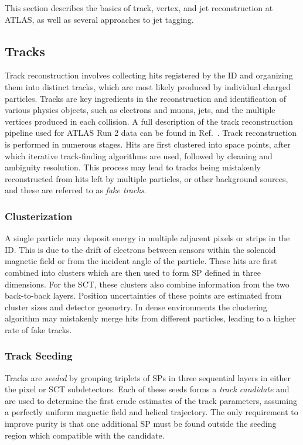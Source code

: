 This section describes the basics of track, vertex, and jet reconstruction at ATLAS, as well as several approaches to jet tagging.

\subsection{Tracks}

Track reconstruction involves collecting hits registered by the \Gls{ID} and organizing them into distinct tracks, which are most likely produced by individual charged particles.
Tracks are key ingredients in the reconstruction and identification of various physics objects, such as electrons and muons, jets, and the multiple vertices produced in each collision.
A full description of the track reconstruction pipeline used for ATLAS Run 2 data can be found in Ref.~\cite{PerformanceATLASTrack}.
Track reconstruction is performed in numerous stages.
Hits are first clustered into space points, after which iterative track-finding algorithms are used, followed by cleaning and ambiguity resolution.
This process may lead to tracks being mistakenly reconstructed from hits left by multiple particles, or other background sources, and these are referred to as \textit{fake tracks}.

\subsubsection{Clusterization}

A single particle may deposit energy in multiple adjacent pixels or strips in the \Gls{ID}\@.
This is due to the drift of electrons between sensors within the solenoid magnetic field or from the incident angle of the particle.
These hits are first combined into clusters which are then used to form \Gls{SP} defined in three dimensions.
For the \Gls{SCT}, these clusters also combine information from the two back-to-back layers.
Position uncertainties of these points are estimated from cluster sizes and detector geometry.
In dense environments the clustering algorithm may mistakenly merge hits from different particles, leading to a higher rate of fake tracks.

\subsubsection{Track Seeding}

Tracks are \textit{seeded} by grouping triplets of SPs in three sequential layers in either the pixel or \Gls{SCT} subdetectors.
Each of these seeds forms a \textit{track candidate} and are used to determine the first crude estimates of the track parameters, assuming a perfectly uniform magnetic field and helical trajectory.
The only requirement to improve purity is that one additional \Gls{SP} must be found outside the seeding region which compatible with the candidate.


